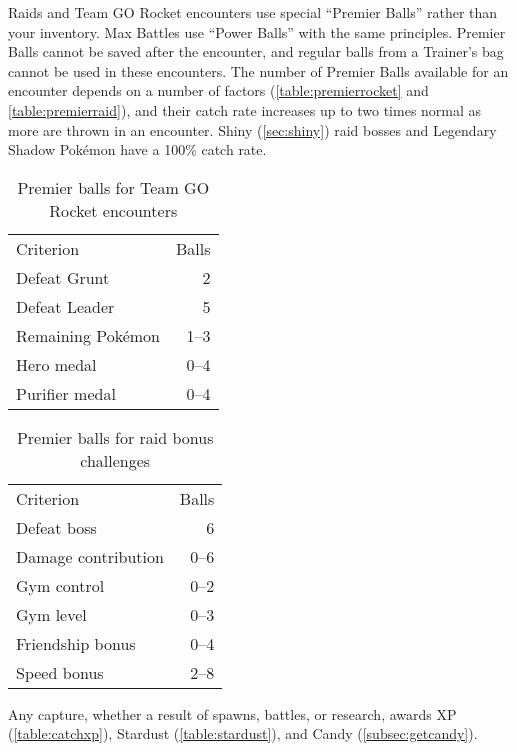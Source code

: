 Raids and Team GO Rocket encounters use special ``Premier Balls'' rather than your inventory.
Max Battles use ``Power Balls'' with the same principles.
Premier Balls cannot be saved after the encounter, and regular balls from
  a Trainer's bag cannot be used in these encounters.
The number of Premier Balls available for an encounter depends on a number of factors (\autoref{table:premierrocket}
  and \autoref{table:premierraid}), and their catch rate increases up to two times normal as more are thrown in an encounter.
Shiny (\autoref{sec:shiny}) raid bosses and Legendary Shadow Pokémon have a 100\% catch rate.
\begin{table}
\centering
\begin{tabular}{lr}
Criterion & Balls\\
\Midrule
Defeat Grunt & 2\\
Defeat Leader & 5\\
Remaining Pokémon & 1--3\\
Hero medal & 0--4\\
Purifier medal & 0--4\\
\end{tabular}
  \caption{Premier balls for Team GO Rocket encounters\label{table:premierrocket}}
\end{table}
\begin{table}
\centering
\begin{tabular}{lr}
Criterion & Balls\\
\Midrule
  Defeat boss & 6\\
  Damage contribution & 0--6\\
  Gym control & 0--2\\
  Gym level & 0--3\\
  Friendship bonus & 0--4\\
  Speed bonus & 2--8\\
\end{tabular}
  \caption{Premier balls for raid bonus challenges\label{table:premierraid}}
\end{table}
Any capture, whether a result of spawns, battles, or research, awards XP (\autoref{table:catchxp}),
 Stardust (\autoref{table:stardust}), and Candy (\autoref{subsec:getcandy}).
